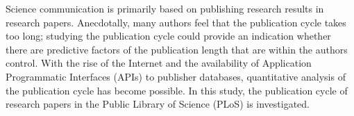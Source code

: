 Science communication is primarily based on publishing research results in research papers. Anecdotally, many authors feel that the publication cycle takes too long; studying the publication cycle could provide an indication whether there are predictive factors of the publication length that are within the authors control. With the rise of the Internet and the availability of Application Programmatic Interfaces (APIs) to publisher databases, quantitative analysis of the publication cycle has become possible. In this study, the publication cycle of research papers in the Public Library of Science (PLoS) is investigated.